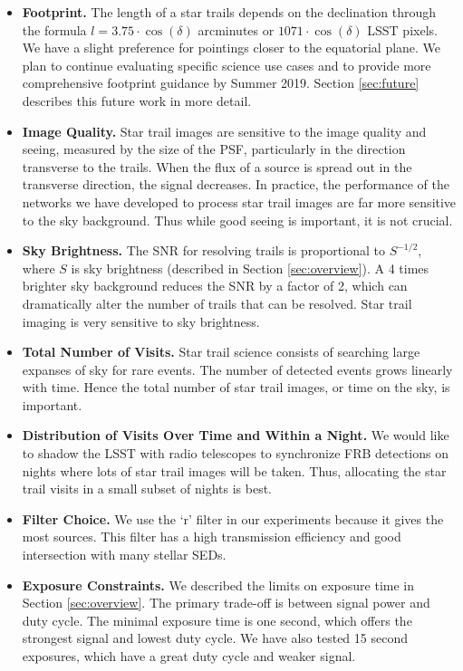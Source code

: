 \documentclass[12pt, letterpaper]{article}
\begin{document}
\begin{itemize}
\item \textbf{Footprint.} {\color{green}The length of a star trails depends on the declination through the formula $l = 3.75 \cdot \cos(\delta)$ arcminutes or $1071 \cdot \cos(\delta)$ LSST pixels. We have a slight preference for pointings closer to the equatorial plane. We plan to continue evaluating specific science use cases and to provide more comprehensive footprint guidance by Summer 2019. Section \ref{sec:future} describes this future work in more detail.}

\item \textbf{Image Quality.} Star trail images are sensitive to the image quality and seeing, measured by the size of the PSF, particularly in the direction transverse to the trails. When the flux of a source is spread out in the transverse direction, the signal decreases. In practice, the performance of the networks we have developed to process star trail images are far more sensitive to the sky background. Thus while good seeing is important, it is not crucial.

\item \textbf{Sky Brightness.} The SNR for resolving trails is proportional to $S^{-1/2}$, where $S$ is sky brightness (described in Section \ref{sec:overview}). A 4 times brighter sky background reduces the SNR by a factor of 2, which can dramatically alter the number of trails that can be resolved. Star trail imaging is very sensitive to sky brightness. 

\item \textbf{Total Number of Visits.} Star trail science consists of searching large expanses of sky for rare events. The number of detected events grows linearly with time. Hence the total number of star trail images, or time on the sky, is important.

\item \textbf{Distribution of Visits Over Time and Within a Night.} We would like to shadow the LSST with radio telescopes to synchronize FRB detections on nights where lots of star trail images will be taken. Thus, allocating the star trail visits in a small subset of nights is best. 

\item \textbf{Filter Choice.} We use the `r' filter in our experiments because it gives the most sources. This filter has a high transmission efficiency and good intersection with many stellar SEDs.

\item \textbf{Exposure Constraints.} We described the limits on exposure time in Section \ref{sec:overview}. The primary trade-off is between signal power and duty cycle. The minimal exposure time is one second, which offers the strongest signal and lowest duty cycle. We have also tested 15 second exposures, which have a great duty cycle and weaker signal. 
\end{itemize}
\end{document}
